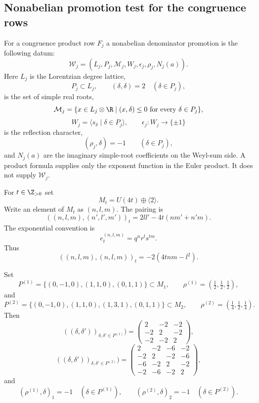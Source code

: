 \subsection{Nonabelian promotion test for the congruence rows}

\begin{definition}
For a congruence product row $F_j$ a nonabelian denominator promotion is
the following datum:
$$
\mathscr W_j=(L_j,P_j,\mathcal M_j,W_j,\epsilon_j,\rho_j,N_j(a)).
$$
Here $L_j$ is the Lorentzian degree lattice,
$$
P_j\subset L_j,\qquad (\delta,\delta)=2\quad(\delta\in P_j),
$$
is the set of simple real roots,
$$
\mathcal M_j=\{x\in L_j\otimes\R\mid (x,\delta)\leq0
\hbox{ for every }\delta\in P_j\},
$$
$$
W_j=\langle s_\delta\mid \delta\in P_j\rangle,
\qquad
\epsilon_j:W_j\to\{\pm1\}
$$
is the reflection character,
$$
(\rho_j,\delta)=-1\qquad(\delta\in P_j),
$$
and $N_j(a)$ are the imaginary simple-root coefficients on the
Weyl-sum side.  A product formula supplies only the exponent function in
the Euler product.  It does not supply $\mathscr W_j$.
\end{definition}

\begin{definition}
For $t\in\Z_{>0}$ set
$$
M_t=U(4t)\oplus\langle2\rangle.
$$
Write an element of $M_t$ as $(n,l,m)$.  The pairing is
$$
((n,l,m),(n',l',m'))_t
=2ll'-4t(nm'+n'm).
$$
The exponential convention is
$$
e_t^{(n,l,m)}=q^nr^ls^{tm}.
$$
Thus
$$
((n,l,m),(n,l,m))_t=-2(4tnm-l^2).
$$
\end{definition}

\begin{lemma}
Set
$$
P^{(1)}=\{(0,-1,0),(1,1,0),(0,1,1)\}\subset M_1,
\qquad
\rho^{(1)}=(\tfrac12,\tfrac12,\tfrac12),
$$
and
$$
P^{(2)}=\{(0,-1,0),(1,1,0),(1,3,1),(0,1,1)\}\subset M_2,
\qquad
\rho^{(2)}=(\tfrac14,\tfrac12,\tfrac14).
$$
Then
$$
((\delta,\delta'))_{\delta,\delta'\in P^{(1)}})
=
\begin{pmatrix}
2&-2&-2\\
-2&2&-2\\
-2&-2&2
\end{pmatrix},
$$
$$
((\delta,\delta'))_{\delta,\delta'\in P^{(2)}})
=
\begin{pmatrix}
2&-2&-6&-2\\
-2&2&-2&-6\\
-6&-2&2&-2\\
-2&-6&-2&2
\end{pmatrix},
$$
and
$$
(\rho^{(1)},\delta)_1=-1\quad(\delta\in P^{(1)}),
\qquad
(\rho^{(2)},\delta)_2=-1\quad(\delta\in P^{(2)}).
$$
\end{lemma}

